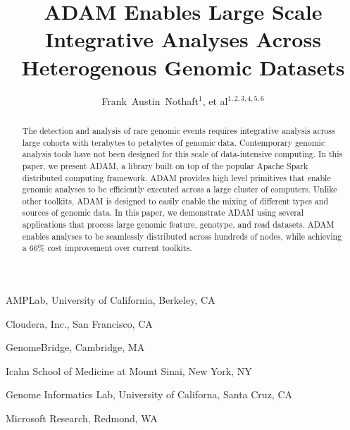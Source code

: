 \documentclass{nature}
\title{ADAM Enables Large Scale Integrative Analyses Across Heterogenous Genomic Datasets}
\author{Frank~Austin~Nothaft$^1$, et al$^{1, 2, 3, 4, 5, 6}$}
\begin{document}
\maketitle

\begin{affiliations}
\item AMPLab, University of California, Berkeley, CA
\item Cloudera, Inc., San Francisco, CA
\item GenomeBridge, Cambridge, MA
\item Icahn School of Medicine at Mount Sinai, New York, NY
\item Genome Informatics Lab, University of Californa, Santa Cruz, CA
\item Microsoft Research, Redmond, WA
\end{affiliations}

\begin{abstract}

The detection and analysis of rare genomic events requires integrative analysis across
large cohorts with terabytes to petabytes of genomic data. Contemporary genomic analysis tools
have not been designed for this scale of data-intensive computing. In this paper, we present
ADAM, a library built on top of the popular Apache Spark distributed computing framework.
ADAM provides high level primitives that enable genomic analyses to be efficiently executed
across a large cluster of computers. Unlike other toolkits, ADAM is designed to easily enable
the mixing of different types and sources of genomic data. In this paper, we demonstrate ADAM
using several applications that process large genomic feature, genotype, and read datasets.
ADAM enables analyses to be seamlessly distributed across hundreds of nodes, while achieving a
66\% cost improvement over current toolkits.
\end{abstract}
\end{document}
